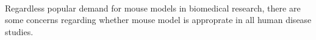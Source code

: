 \\ Regardless popular demand for mouse models in biomedical research, there are some concerns regarding whether mouse model is approprate in all human disease studies. 